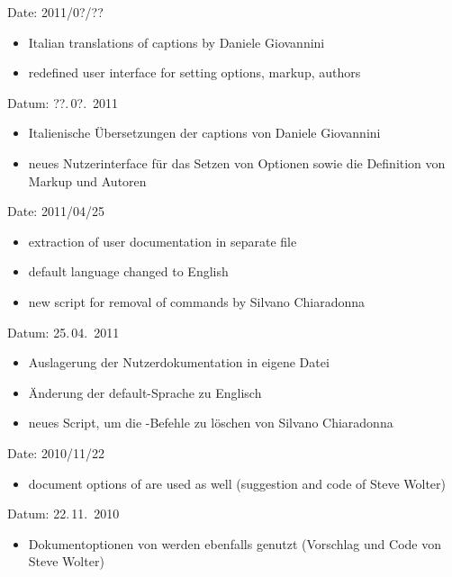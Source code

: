 
\ifENGLISH
	Date: 2011/0?/??
	\begin{itemize}
		\item Italian translations of captions by Daniele Giovannini
		\item redefined user interface for setting options, markup, authors
	\end{itemize}
\fi
	\ifGERMAN
		Datum: ??.\,0?.~2011
		\begin{itemize}
			\item Italienische Übersetzungen der captions von Daniele Giovannini
			\item neues Nutzerinterface für das Setzen von Optionen sowie die Definition von Markup und Autoren
		\end{itemize}
	\fi


\ifENGLISH
	Date: 2011/04/25
	\begin{itemize}
		\item extraction of user documentation in separate file
		\item default language changed to English
		\item new script for removal of  commands by Silvano Chiaradonna
	\end{itemize}
\fi
	\ifGERMAN
		Datum: 25.\,04.~2011
		\begin{itemize}
			\item Auslagerung der Nutzerdokumentation in eigene Datei
			\item Änderung der default-Sprache zu Englisch
			\item neues Script, um die -Befehle zu löschen von Silvano Chiaradonna
		\end{itemize}
	\fi


\ifENGLISH
	Date: 2010/11/22
	\begin{itemize}
	\item document options of  are used as well (suggestion and code of Steve Wolter)
	\end{itemize}
\fi
	\ifGERMAN
		Datum: 22.\,11.~2010
		\begin{itemize}
		\item Dokumentoptionen von  werden ebenfalls genutzt (Vorschlag und Code von Steve Wolter)
		\end{itemize}
	\fi


